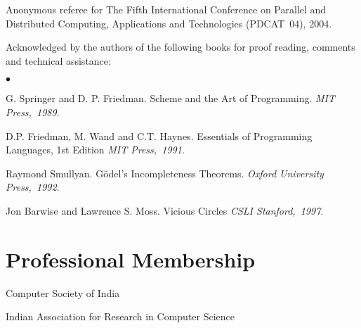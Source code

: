 \documentclass[11pt,margin,line]{res}
\newenvironment{list2}{
  \begin{list}{$\bullet$}{%
      \setlength{\itemsep}{0in}
      \setlength{\parsep}{0in} \setlength{\parskip}{0in}
      \setlength{\topsep}{0in} \setlength{\partopsep}{0in} 
      \setlength{\leftmargin}{0.2in}}}{\end{list}}
\begin{document}
\begin{resume}
Anonymous referee for The Fifth International Conference on
Parallel and Distributed Computing, Applications and
Technologies (PDCAT~04), 2004.  

Acknowledged by the authors of the following books for
proof reading, comments  and technical assistance:\\
\begin{list2}
 \item G. Springer and D. P. Friedman.  {Scheme and the Art of
 Programming}.  {\em {MIT Press,~1989}}.
 \item D.P. Friedman, M. Wand and C.T. Haynes.  Essentials of
 Programming Languages, 1st Edition  {\em {MIT Press,~1991}}.
 \item Raymond Smullyan. G\"{o}del's Incompleteness Theorems.
 {\em {Oxford University Press,~1992}}.
 \item Jon Barwise and Lawrence S. Moss. Vicious Circles
 {\em {CSLI Stanford,~1997}}.
\end{list2}






\vspace{2em}

\section{\sc Professional Membership}

Computer Society of India

Indian Association for Research in Computer Science


\end{resume}
\end{document}
